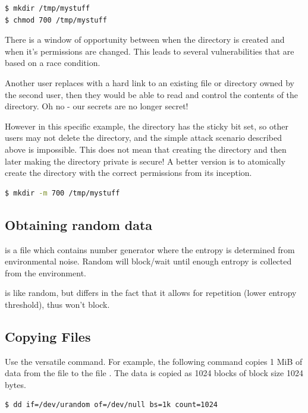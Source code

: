 \begin{lstlisting}[language=bash]
$ mkdir /tmp/mystuff
$ chmod 700 /tmp/mystuff
\end{lstlisting}

There is a window of opportunity between when the directory is created and when it's permissions are changed.
This leads to several vulnerabilities that are based on a race condition.

Another user replaces  with a hard link to an existing file or directory owned by the second user, then they would be able to read and control the contents of the  directory.
Oh no - our secrets are no longer secret!

However in this specific example, the  directory has the sticky bit set, so other users may not delete the  directory, and the simple attack scenario described above is impossible.
This does not mean that creating the directory and then later making the directory private is secure!
A better version is to atomically create the directory with the correct permissions from its inception.

\begin{lstlisting}[language=bash]
$ mkdir -m 700 /tmp/mystuff
\end{lstlisting}

\subsection{Obtaining random data}

 is a file which contains number generator where the entropy is determined from environmental noise.
Random will block/wait until enough entropy is collected from the environment.

 is like random, but differs in the fact that it allows for repetition (lower entropy threshold), thus won't block.


\subsection{Copying Files}

Use the versatile  command.
For example, the following command copies 1 MiB of data from the file  to the file .
The data is copied as 1024 blocks of block size 1024 bytes.

\begin{lstlisting}[language=bash]
$ dd if=/dev/urandom of=/dev/null bs=1k count=1024
\end{lstlisting}

